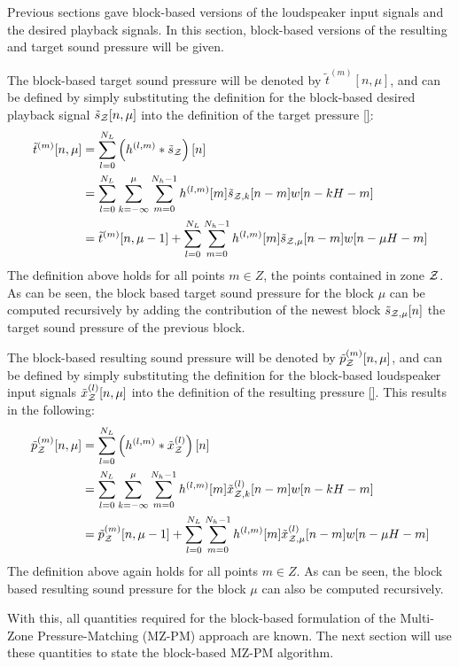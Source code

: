 Previous sections gave block-based versions of the loudspeaker input signals and the desired playback signals.
In this section, block-based versions of the resulting and target sound pressure will be given. 

The block-based target sound pressure will be denoted by $\tilde{t}^{(m)}[n, \mu]$, and can be defined by simply 
substituting the definition for the block-based desired playback signal $\tilde{s}_{\mathcal{Z}}[n, \mu]$ into the definition of the target pressure \autoref{}:
\begin{align}
    \tilde{t}^{(m)}[n, \mu] &= \sum_{l=0}^{N_L} \left(h^{(l,m)} \ast \tilde{s}_{\mathcal{Z}}\right)[n]\\
                       &= \sum_{l=0}^{N_L}\sum_{k=-\infty}^{\mu}\sum_{m=0}^{N_h - 1}h^{(l,m)}[m]\tilde{s}_{\mathcal{Z},k}[n - m]w[n - kH - m] \\
                       &= \tilde{t}^{(m)}[n, \mu - 1] + \sum_{l=0}^{N_L}\sum_{m=0}^{N_h - 1}h^{(l,m)}[m]\tilde{s}_{\mathcal{Z},\mu}[n - m]w[n - \mu H - m] 
\end{align}
The definition above holds for all points $m\in Z$, the points contained in zone $\mathcal{Z}$.  
As can be seen, the block based target sound pressure for the block $\mu$ can be computed recursively by adding the contribution of the newest block 
$\tilde{s}_{\mathcal{Z},\mu}[n]$ the target sound pressure of the previous block.

The block-based resulting sound pressure will be denoted by $\tilde{p}_{\mathcal{Z}}^{(m)}[n, \mu]$, and can be defined by simply 
substituting the definition for the block-based loudspeaker input signals $\tilde{x}_{\mathcal{Z}}^{(l)}[n, \mu]$ into the definition of the resulting pressure \autoref{}.
This results in the following: 
\begin{align}
    \tilde{p}_{\mathcal{Z}}^{(m)}[n, \mu] &= \sum_{l=0}^{N_L} \left(h^{(l,m)} \ast \tilde{x}^{(l)}_{\mathcal{Z}}\right)[n]\\
                       &= \sum_{l=0}^{N_L}\sum_{k=-\infty}^{\mu}\sum_{m=0}^{N_h - 1}h^{(l,m)}[m]\tilde{x}^{(l)}_{\mathcal{Z},k}[n - m]w[n - kH - m] \\
                       &= \tilde{p}_{\mathcal{Z}}^{(m)}[n, \mu - 1] + \sum_{l=0}^{N_L}\sum_{m=0}^{N_h - 1}h^{(l,m)}[m]\tilde{x}^{(l)}_{\mathcal{Z},\mu}[n - m]w[n - \mu H - m]  
\end{align}
The definition above again holds for all points $m\in Z$.  
As can be seen, the block based resulting sound pressure for the block $\mu$ can also be computed recursively.

With this,  all quantities required for the block-based formulation of the Multi-Zone Pressure-Matching (MZ-PM) approach are known.
The next section will use these quantities to state the block-based MZ-PM algorithm.


